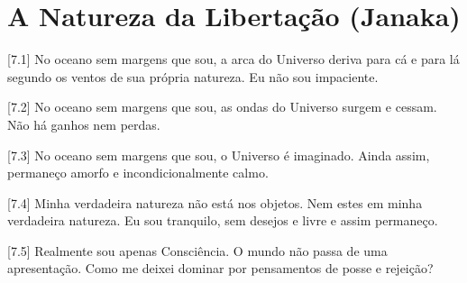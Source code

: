 \chapter[(Janaka)]{A Natureza da Libertação (Janaka)}

[7.1] No oceano sem margens que sou, a arca do Universo deriva para cá e para lá segundo os ventos de sua própria natureza. Eu não sou impaciente.

[7.2] No oceano sem margens que sou, as ondas do Universo surgem e cessam. Não há ganhos nem perdas.

[7.3] No oceano sem margens que sou, o Universo é imaginado. Ainda assim, permaneço amorfo e incondicionalmente calmo.

[7.4] Minha verdadeira natureza não está nos objetos. Nem estes em minha verdadeira natureza. Eu sou tranquilo, sem desejos e livre e assim permaneço.

[7.5] Realmente sou apenas Consciência. O mundo não passa de uma apresentação. Como me deixei dominar por pensamentos de posse e rejeição?
